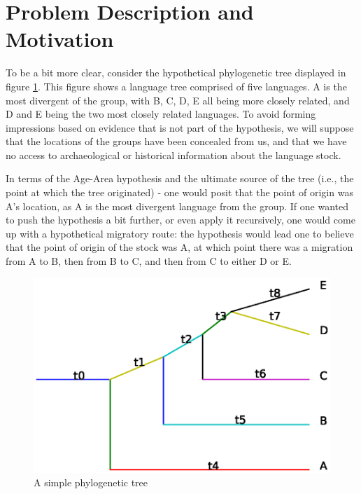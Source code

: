\documentclass[11pt]{article}
\begin{document}
\section{Problem Description and Motivation}

To be a bit more clear, consider the hypothetical phylogenetic tree displayed in figure \ref{fig1}. This figure shows a language tree comprised
of five languages. A is the most divergent of the group, with B, C, D, E all being more closely related, and D and E being the two most closely
related languages. To avoid forming impressions based on evidence that is not part of the hypothesis, we will suppose that the locations of the
groups have been concealed from us, and that we have no access to archaeological or historical information about the language stock.

In terms of the Age-Area hypothesis and the ultimate source of the tree (i.e., the point at which the tree originated) - one would posit that the point of origin was A's location, as A is the most divergent language from the group. If one wanted to push the hypothesis a bit further, or even apply it recursively, one would come up with a hypothetical migratory route: the hypothesis would lead one to believe that the point of origin of the stock was A, at which point there was a migration from A to B, then from B to C, and then from C to either D or E.

\begin{figure}
\begin{center}
\includegraphics[width=\textwidth]{simplePT.eps}
\caption{A simple phylogenetic tree}
\end{center} \label{fig1}
\end{figure}
\end{document}
